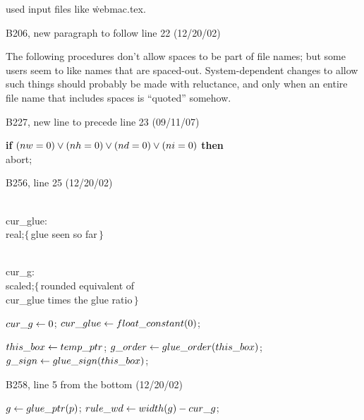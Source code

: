 {{\tenpoint\noindent
used input files like \.{webmac.tex}.

\bugonpage B206, new paragraph to follow line 22 (12/20/02)

\tenpoint\noindent\quad
The following procedures don't allow spaces to be part of
file names; but some users seem to like names that are spaced-out.
System-dependent changes to allow such things should probably
be made with reluctance, and only when an entire file name that
includes spaces is ``quoted'' somehow.

\bugonpage B227, new line to precede line 23 (09/11/07)

\ninepoint\noindent
{\bf if} $(\\{nw}=0)\lor(\\{nh}=0)\lor(\\{nd}=0)\lor(\\{ni}=0)$
 {\bf then} \\{abort};

\bugonpage B256, line 25 (12/20/02)

\ninepoint\noindent
\qquad\\{cur\_glue}: \\{real};\quad$\{\,$glue seen so far$\,\}$\par\noindent
\qquad\\{cur\_g}: \\{scaled};\quad$\{\,$rounded
  equivalent of \\{cur\_glue} times the glue ratio$\,\}$\par\noindent
{} $\\{cur\_g}\gets0$;
  $\\{cur\_glue}\gets\\{float\_constant}(0)$;\par\noindent
\quad$\\{this\_box}\gets\\{temp\_ptr}$;
 $\\{g\_order}\gets\\{glue\_order}(\\{this\_box})$;
 $\\{g\_sign}\gets\\{glue\_sign}(\\{this\_box})$;

\bugonpage B258, line 5 from the bottom (12/20/02)

\ninepoint\noindent
{} $g\gets\\{glue\_ptr}(p)$;
  $\\{rule\_wd}\gets\\{width}(g)-\\{cur\_g}$;

}}
